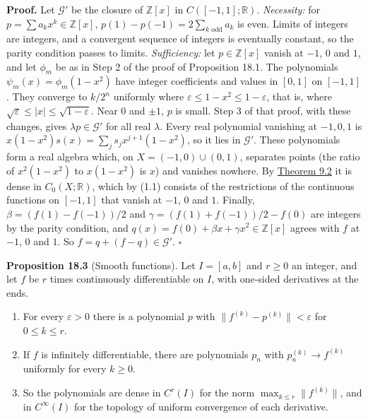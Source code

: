 \documentclass[
  english,
  11pt,
  a4paper,
]{article}
\providecommand{\tightlist}{%
  \setlength{\itemsep}{0pt}\setlength{\parskip}{0pt}}
\begin{document}
\textbf{Proof.} Let \(\mathcal G'\) be the closure of \(\mathbb Z[x]\)
in \(C([-1,1];\mathbb R)\). \emph{Necessity:} for
\(p=\sum a_kx^k\in\mathbb Z[x]\), \(p(1)-p(-1)=2\sum_{k\text{ odd}}a_k\)
is even. Limits of integers are integers, and a convergent sequence of
integers is eventually constant, so the parity condition passes to
limits. \emph{Sufficiency:} let \(p\in\mathbb Z[x]\) vanish at \(-1\),
\(0\) and \(1\), and let \(\phi_m\) be as in Step 2 of the proof of
Proposition 18.1. The polynomials \(\psi_m(x)=\phi_m(1-x^2)\) have
integer coefficients and values in \([0,1]\) on \([-1,1]\). They
converge to \(k/2^n\) uniformly where
\(\varepsilon\leq1-x^2\leq1-\varepsilon\), that is, where
\(\sqrt\varepsilon\leq|x|\leq\sqrt{1-\varepsilon}\). Near \(0\) and
\(\pm1\), \(p\) is small. Step 3 of that proof, with these changes,
gives \(\lambda p\in\mathcal G'\) for all real \(\lambda\). Every real
polynomial vanishing at \(-1,0,1\) is
\(x(1-x^2)s(x)=\sum_js_jx^{j+1}(1-x^2)\), so it lies in \(\mathcal G'\).
These polynomials form a real algebra which, on \(X=(-1,0)\cup(0,1)\),
separates points (the ratio of \(x^2(1-x^2)\) to \(x(1-x^2)\) is \(x\))
and vanishes nowhere. By
\hyperlink{the-stone-weierstrass-theorem-for-functions-vanishing-at-infinity--oa-fnd-sw-08}{Theorem
9.2} it is dense in \(C_0(X;\mathbb R)\), which by (1.1) consists of the
restrictions of the continuous functions on \([-1,1]\) that vanish at
\(-1\), \(0\) and \(1\). Finally, \(\beta=(f(1)-f(-1))/2\) and
\(\gamma=(f(1)+f(-1))/2-f(0)\) are integers by the parity condition, and
\(q(x)=f(0)+\beta x+\gamma x^2\in\mathbb Z[x]\) agrees with \(f\) at
\(-1\), \(0\) and \(1\). So \(f=q+(f-q)\in\mathcal G'\). \(\square\)

\textbf{Proposition 18.3} (Smooth functions). Let \(I=[a,b]\) and
\(r\geq0\) an integer, and let \(f\) be \(r\) times continuously
differentiable on \(I\), with one-sided derivatives at the ends.

\begin{enumerate}
\tightlist
\item
  For every \(\varepsilon>0\) there is a polynomial \(p\) with
  \(\|f^{(k)}-p^{(k)}\|<\varepsilon\) for \(0\leq k\leq r\).
\item
  If \(f\) is infinitely differentiable, there are polynomials \(p_n\)
  with \(p_n^{(k)}\to f^{(k)}\) uniformly for every \(k\geq0\).
\item
  So the polynomials are dense in \(C^r(I)\) for the norm
  \(\max_{k\leq r}\|f^{(k)}\|\), and in \(C^\infty(I)\) for the topology
  of uniform convergence of each derivative.
\end{enumerate}
\end{document}
